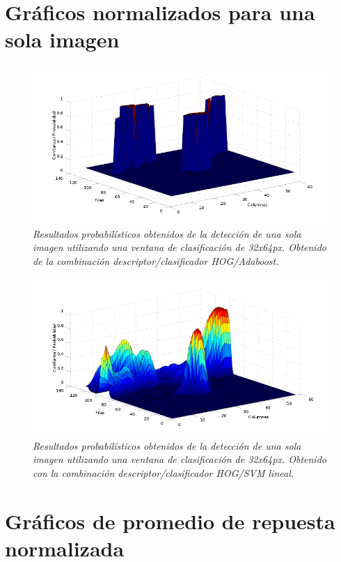  
\section{Gráficos normalizados para una sola imagen}

\begin{figure}[H]
  \centering
  \includegraphics[scale=.6]{images/sig/boost/prueba2}
  \caption{\em  Resultados probabilísticos obtenidos de la detección de una sola imagen utilizando una ventana de clasificación de 32x64px. Obtenido de la combinación descriptor/clasificador HOG/Adaboost.}  
  \label{fig:gn1}
\end{figure}

\begin{figure}[H]
  \centering
  \includegraphics[scale=.6]{images/sig/svm/prueba2}
  \caption{\em  Resultados probabilísticos obtenidos de la detección de una sola imagen utilizando una ventana de clasificación de 32x64px. Obtenido con la combinación descriptor/clasificador HOG/SVM lineal.}  
  \label{fig:gn2}
\end{figure}


\section{Gráficos de promedio de repuesta normalizada}


